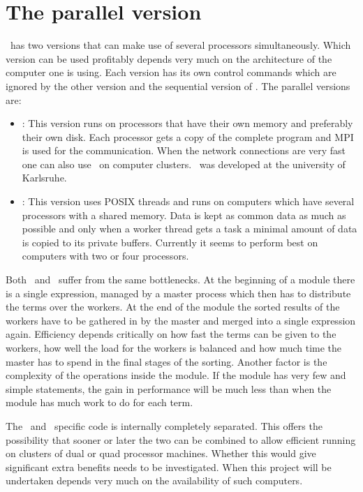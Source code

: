 
\chapter{The parallel version}
\label{parallel}


\FORM\ has two versions that can make use of several processors 
simultaneously. Which version can be used profitably depends very much on 
the architecture of the computer one is using. Each version has its own 
control commands which are ignored by the other version and the sequential 
version of \FORM\@. The parallel versions are:
\begin{itemize}
\item \ParFORM{}: This version runs on processors that have 
their own memory and preferably their own disk. Each processor gets a copy 
of the complete program and MPI is used for the 
communication. When the network connections are very 
fast one can also use \ParFORM\ on computer clusters. \ParFORM\ was 
developed at the university of Karlsruhe.
\item \TFORM{}: This version uses POSIX threads and runs on computers 
which have several processors with a shared memory. Data is kept as common 
data as much as possible and only when a worker thread gets a task a 
minimal amount of data is copied to its private buffers. Currently it seems 
to perform best on computers with two or four processors.
\end{itemize}
Both \ParFORM\ and \TFORM\ suffer from the same bottlenecks. 
At the beginning of a module there is a single expression, managed by a 
master process which then has to distribute the terms over the workers. At 
the end of the module the sorted results of the workers have to be gathered 
in by the master and merged into a single expression again. 
Efficiency depends critically on how fast the terms can be given to the 
workers, how well the load for the workers is balanced and 
how much time the master has to spend in the final stages of the sorting. 
Another factor is the complexity of the operations inside the module. If 
the module has very few and simple statements, the gain in performance will 
be much less than when the module has much work to do for each term.

The \ParFORM\ and \TFORM\ specific code is internally completely separated. 
This offers the possibility that sooner or later the two can be combined to 
allow efficient running on clusters of dual or quad processor machines. 
Whether this would give significant extra benefits needs to be 
investigated. When this project will be undertaken depends very much on the 
availability of such computers.

